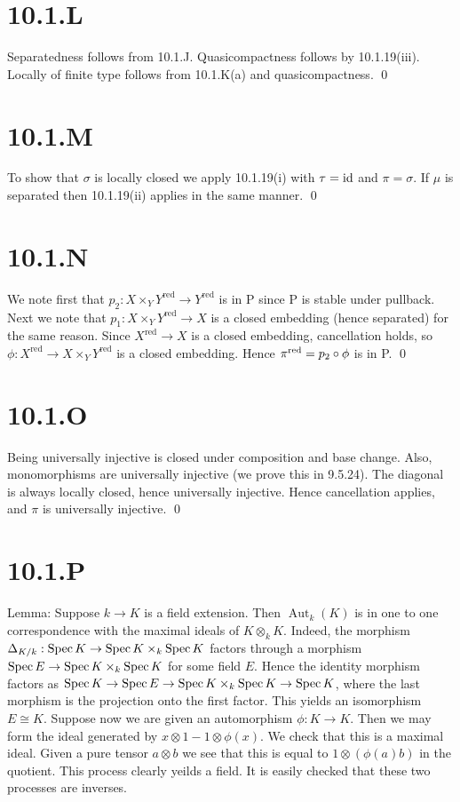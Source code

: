 \documentclass{article}
\begin{document}
\section{10.1.L}
Separatedness follows from 10.1.J. Quasicompactness follows by 10.1.19(iii).
Locally of finite type follows from 10.1.K(a) and quasicompactness. \qed

\section{10.1.M}
To show that $\sigma$ is locally closed we apply 10.1.19(i) with
$\tau=\operatorname{id}$ and $\pi=\sigma$. If $\mu$ is
separated then 10.1.19(ii) applies in the same manner. \qed

\section{10.1.N}
We note first that $p_2: X \times_Y Y^{\text{red}} \to Y^{\text{red}}$ is in P since P is stable under
pullback. Next we note that $p_1: X \times_Y Y^{\text{red}} \to X$ is a closed embedding (hence
separated) for the same reason. Since $X^{\text{red}} \to X$ is a closed
embedding, cancellation holds, so $\phi: X^{\text{red}} \to X \times_Y
    Y^{\text{red}}$ is a closed embedding.
Hence $\pi^{\text{red}}=p_2 \circ \phi$ is in P. \qed

\section{10.1.O}
Being universally injective is closed under composition and base change. Also,
monomorphisms are universally injective (we prove this in 9.5.24). The diagonal
is always locally closed, hence universally injective. Hence cancellation
applies, and $\pi$ is universally injective. \qed

\section{10.1.P}
Lemma: Suppose $k \to K$ is a field extension. Then
$\operatorname{Aut}_k(K)$ is in one to one correspondence with the maximal ideals
of $K \otimes_k K$. Indeed, the morphism $\Delta_{K/k}: \operatorname{Spec} K \to \operatorname{Spec} K \times_k \operatorname{Spec} K$ factors
through a morphism $\operatorname{Spec} E \to \operatorname{Spec} K \times_k \operatorname{Spec} K$ for some field
$E$. Hence the identity morphism factors as
$\operatorname{Spec} K \to \operatorname{Spec} E \to \operatorname{Spec} K \times_k \operatorname{Spec} K \to \operatorname{Spec} K$, where the last morphism is the projection onto the
first factor. This yields an isomorphism $E \cong K$. Suppose now we
are given an automorphism $\phi: K \to K$. Then we may form the ideal
generated by $x \otimes 1 - 1 \otimes \phi(x)$. We check that this is a maximal ideal.
Given a pure tensor $a \otimes b$ we see that this is equal to
$1 \otimes (\phi(a)b)$ in the quotient. This process clearly yeilds a field. It
is easily checked that these two processes are inverses.
\end{document}
